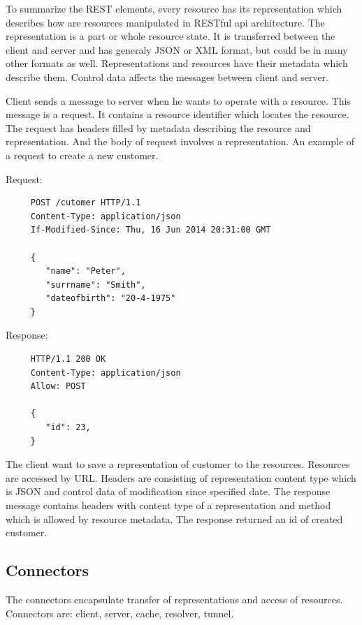 To summarize the REST elements, every resource has its representation which describes how are resources manipulated in RESTful \gls{api} architecture. The representation is a part or whole resource state. It is transferred between the client and server and has generaly JSON or XML format, but could be in many other formats as well. Representations and resources have their metadata which describe them. Control data affects the messages between client and server.

Client sends a message to server when he wants to operate with a resource. This message is a request. It contains a resource identifier which locates the resource. The request has headers filled by metadata describing the resource and representation. And the body of request involves a representation. An example of a request to create a new customer.

Request:
\begin{center}
  \begin{lstlisting}
     POST /cutomer HTTP/1.1
     Content-Type: application/json
     If-Modified-Since: Thu, 16 Jun 2014 20:31:00 GMT

     {
        "name": "Peter", 
        "surrname": "Smith", 
        "dateofbirth": "20-4-1975"
     }
  \end{lstlisting}
  \end{center}
  
Response:
  \begin{center}
  \begin{lstlisting}
     HTTP/1.1 200 OK 
     Content-Type: application/json
     Allow: POST
     
     {
        "id": 23, 
     }
  \end{lstlisting}
  \end{center}
  
     
The client want to save a representation of customer to the resources. Resources are accessed by URL. Headers are consisting of representation content type which is JSON and control data of modification since specified date. The response message contains headers with content type of a representation and method which is allowed by resource metadata. The response returned an id of created customer. 





\subsection{Connectors}
The connectors encapsulate transfer of representations and access of resources. Connectors are: client, server, cache, resolver, tunnel. %

